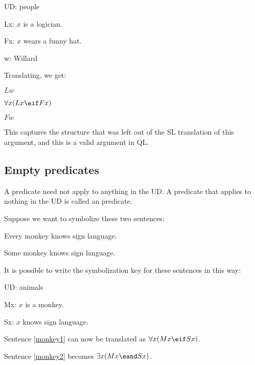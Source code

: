 
\begin{ekey}
\item[UD:] people
\item[Lx:] $x$ is a logician.
\item[Fx:] $x$ wears a funny hat.
\item[w:] Willard
\end{ekey}
Translating, we get:
\begin{earg}
\item[] $Lw$
\item[] $\forall x(Lx \eif Fx)$
\item[\therefore] $Fw$
\end{earg}

This captures the structure that was left out of the SL translation of this argument, and this is a valid argument in QL.









\subsection{Empty predicates}
A predicate need not apply to anything in the UD. A predicate that applies to nothing in the UD is called an  predicate.

Suppose we want to symbolize these two sentences:
\begin{earg}
\item[\ex{monkey1}]Every monkey knows sign language.
\item[\ex{monkey2}]Some monkey knows sign language.
\end{earg}
It is possible to write the symbolization key for these sentences in this way:
\begin{ekey}
\item[UD:] animals
\item[Mx:] $x$ is a monkey.
\item[Sx:] $x$ knows sign language.
\end{ekey}

Sentence \ref{monkey1} can now be translated as $\forall x(Mx \eif Sx)$.

Sentence \ref{monkey2} becomes $\exists x(Mx \eand Sx)$.


